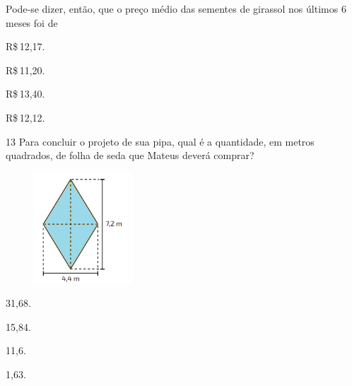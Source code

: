 Pode-se dizer, então, que o preço médio das sementes de girassol nos
últimos 6 meses foi de

\begin{escolha}
\item R\$\,12,17.
\item R\$\,11,20.
\item R\$\,13,40.
\item R\$\,12,12.
\end{escolha}









\pagebreak

\num{13} Para concluir o projeto de sua pipa, qual é a quantidade, em metros quadrados, de
folha de seda que Mateus deverá comprar?

\begin{figure}[H]
\centering\includegraphics[width=1.45833in,height=1.63333in]{./imgSAEB_8_MAT/media/image59.png}
\end{figure}

\begin{escolha}
\item 31,68.
\item 15,84.
\item 11,6.
\item 1,63.
\end{escolha}

